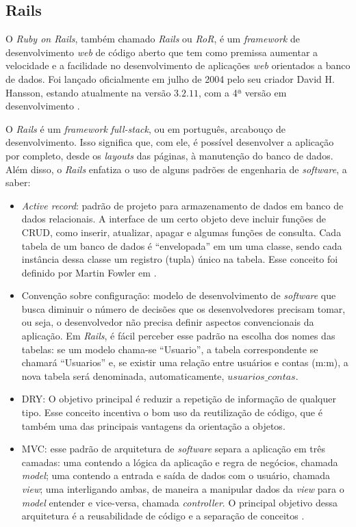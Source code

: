 \subsection{Rails}
	O \emph{Ruby on Rails}, também chamado \emph{Rails} ou \emph{RoR}, é um \emph{framework} de desenvolvimento \emph{web} de código aberto que tem como premissa aumentar a velocidade e a facilidade no desenvolvimento de aplicações \emph{web} orientados a banco de dados.  Foi lançado oficialmente em julho de 2004 pelo seu criador David H. Hansson, estando atualmente na versão $3.2.11$, com a 4ª versão em desenvolvimento \cite{rails4}.  
	
	O \emph{Rails} é um \emph{framework} \emph{full-stack}, ou em português, arcabouço de desenvolvimento. Isso significa que, com ele, é possível desenvolver a aplicação por completo, desde os \emph{layouts} das páginas, à manutenção do banco de dados. Além disso, o \emph{Rails} enfatiza o uso de alguns padrões de engenharia de \emph{software}, a saber:
	
\begin{itemize}
\item \emph{Active record}: padrão de projeto para armazenamento de dados em banco de dados relacionais.  A interface de um certo objeto deve incluir funções de \ac{CRUD},  como inserir, atualizar, apagar e algumas funções de consulta. Cada tabela de um banco de dados é ``envelopada''  em um uma classe, sendo cada instância dessa classe um registro (tupla) único na tabela.  Esse conceito foi  definido por Martin Fowler em \cite{fowler}.
\item Convenção sobre configuração: modelo de desenvolvimento de \emph{software} que busca diminuir o número de decisões que os desenvolvedores precisam tomar, ou seja, o desenvolvedor não precisa definir aspectos convencionais da aplicação. Em \emph{Rails}, é fácil perceber esse padrão na escolha dos nomes das tabelas: se um modelo chama-se ``Usuario'', a tabela correspondente se chamará ``Usuarios'' e, se existir uma relação entre usuários e contas (m:m), a nova tabela será denominada, automaticamente, $usuarios\_contas$.
\item \ac{DRY}: O objetivo principal é reduzir a repetição de informação de qualquer tipo. Esse conceito incentiva o bom uso da reutilização de código, que é também uma das principais vantagens da orientação a objetos.
\item \ac{MVC}: esse padrão de arquitetura de \emph{software} separa a aplicação em três camadas: uma contendo a lógica da aplicação e regra de negócios, chamada \emph{model}; uma contendo a entrada e saída de dados com o usuário, chamada \emph{view}; uma interligando ambas, de maneira a manipular dados da \emph{view} para o \emph{model} entender e vice-versa, chamada \emph{controller}. O principal objetivo dessa arquitetura é a reusabilidade de código e a separação de conceitos \cite{mvc}.
\end{itemize}


